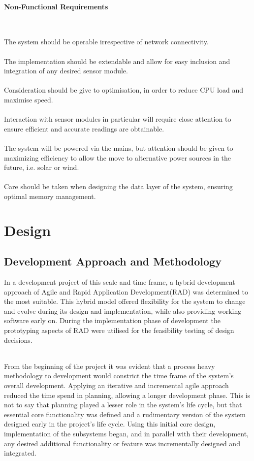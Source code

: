 \documentclass{article}
\begin{document}
\paragraph*{Non-Functional Requirements}\

The system should be operable irrespective of network connectivity. \\\\ The implementation should be extendable and allow for easy inclusion and integration of any desired sensor module. \\\\ Consideration should be give to optimisation, in order to reduce CPU load and maximise speed. \\\\ Interaction with sensor modules in particular will require close attention to ensure efficient and accurate readings are obtainable. \\\\ The system will be powered via the mains, but attention should be given to maximizing efficiency to allow the move to alternative power sources in the future, i.e. solar or wind. \\\\ Care should be taken when designing the data layer of the system, ensuring optimal memory management.

\section{Design}
\subsection{Development Approach and Methodology}
In a development project of this scale and time frame, a hybrid development approach of Agile and Rapid Application Development(RAD) was determined to the most suitable. This hybrid model offered flexibility for the system to change and evolve during its design and implementation, while also providing working software early on. During the implementation phase of development the prototyping aspects of RAD were utilised for the feasibility testing of design decisions. \\\

From the beginning of the project it was evident that a process heavy methodology to development would constrict the time frame of the system’s overall development. Applying an iterative and incremental agile approach reduced the time spend in planning, allowing a longer development phase. This is not to say that planning played a lesser role in the system’s life cycle, but that essential core functionality was defined and a rudimentary version of the system designed early in the project\rq s life cycle. Using this initial core design, implementation of the subsystems began, and in parallel with their development, any desired additional functionality or feature was incrementally designed and integrated.
\end{document}
